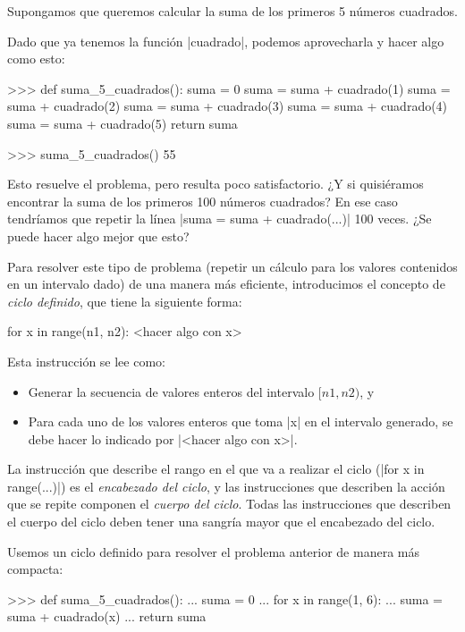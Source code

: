 \begin{problema}
Supongamos que queremos calcular la suma de los primeros 5 números cuadrados.

\begin{solucion}
Dado que ya tenemos la función |cuadrado|, podemos aprovecharla y hacer algo
como esto:

\begin{codigo-python-sn}
>>> def suma_5_cuadrados():
	suma = 0
	suma = suma + cuadrado(1)
	suma = suma + cuadrado(2)
	suma = suma + cuadrado(3)
	suma = suma + cuadrado(4)
	suma = suma + cuadrado(5)
	return suma

>>> suma_5_cuadrados()
55
\end{codigo-python-sn}
\end{solucion}

Esto resuelve el problema, pero resulta poco satisfactorio. ¿Y si quisiéramos
encontrar la suma de los primeros 100 números cuadrados? En ese caso tendríamos
que repetir la línea |suma = suma + cuadrado(...)| 100 veces. ¿Se puede hacer
algo mejor que esto?

Para resolver este tipo de problema (repetir un cálculo para los valores
contenidos en un intervalo dado) de una manera más eficiente, introducimos el
concepto de \emph{ciclo definido}, que tiene la siguiente forma:

\begin{codigo-python-sn}
for x in range(n1, n2):
    <hacer algo con x>
\end{codigo-python-sn}

Esta instrucción se lee como:

\begin{itemize}
\item Generar la secuencia de valores enteros del intervalo $[n1, n2)$, y
\item Para cada uno de los valores enteros que toma |x| en el intervalo generado,
se debe hacer lo indicado por |<hacer algo con x>|.
\end{itemize}

La instrucción que describe el rango en el que va a realizar el ciclo
(|for x in range(...)|) es el \emph{encabezado del ciclo}, y las instrucciones
que describen la acción que se repite componen el \emph{cuerpo del ciclo}.
Todas las instrucciones que describen el cuerpo del ciclo deben tener una
sangría mayor que el encabezado del ciclo.

\begin{solucion}
Usemos un ciclo definido para resolver el problema anterior de manera más
compacta:

\begin{codigo-python-sn}
>>> def suma_5_cuadrados():
...     suma = 0
...     for x in range(1, 6):
...         suma = suma + cuadrado(x)
...     return suma
\end{codigo-python-sn}
\end{solucion}
\end{problema}

